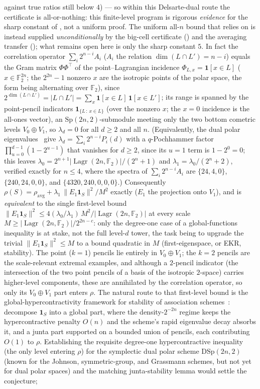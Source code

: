 \documentclass[11pt,a4paper]{article}
\theoremstyle{plain}
\theoremstyle{definition}
\newcommand{\F}{\mathbb{F}}
\DeclareMathOperator{\Lagr}{Lagr}
\begin{document}
against true ratios still below $4$) --- so within this Delsarte-dual route the certificate is all-or-nothing: this finite-level program is rigorous \emph{evidence} for the sharp constant of , not a uniform proof. The uniform all-$n$ bound that  relies on is instead supplied \emph{unconditionally} by the big-cell certificate () and the averaging transfer (); what remains open here is only the sharp constant $5$. In fact the correlation operator $\sum_i 2^{n-i} A_i$ ($A_i$ the relation $\dim(L\cap L')=n-i$) equals the Gram matrix $\Phi\Phi^{\top}$ of the point--Lagrangian incidence $\Phi_{L,x}=\mathbf 1[x\in L]$ ($x\in\F_2^{2n}$; the $2^{2n}-1$ nonzero $x$ are the isotropic points of the polar space, the form being alternating over $\F_2$), since $2^{\dim(L\cap L')}=|L\cap L'|=\sum_x \mathbf 1[x\in L]\,\mathbf 1[x\in L']$; its range is spanned by the point-pencil indicators $\mathbf 1_{\{L\,:\,x\in L\}}$ (over the nonzero $x$; the $x=0$ incidence is the all-ones vector), an $\mathrm{Sp}(2n,2)$-submodule meeting only the two bottom cometric levels $V_0\oplus V_1$, so $\lambda_d=0$ for all $d\ge 2$ and all $n$. (Equivalently, the dual polar eigenvalues~\cite{BCN89} give $\lambda_d=\sum_i 2^{n-i}P_i(d)$ with a $q$-Pochhammer factor $\prod_{u=0}^{d-1}(1-2^{u-1})$ that vanishes for $d\ge 2$, since its $u=1$ term is $1-2^0=0$; this leaves $\lambda_0=2^{n+1}|\Lagr(2n,\F_2)|/(2^n+1)$ and $\lambda_1=\lambda_0/(2^n+2)$, verified exactly for $n\le 4$, where the spectra of $\sum_i 2^{n-i}A_i$ are $\{24,4,0\}$, $\{240,24,0,0\}$, and $\{4320,240,0,0,0\}$.) Consequently $\rho(S)=\rho_{\mathrm{avg}}+\lambda_1\,\lVert E_1\mathbf 1_S\rVert^2/M^2$ exactly ($E_1$ the projection onto $V_1$), and  is \emph{equivalent} to the single first-level bound $\lVert E_1\mathbf 1_S\rVert^2 \le 4(\lambda_0/\lambda_1)\,M^2/|\Lagr(2n,\F_2)|$ at every scale $M\ge|\Lagr(2n,\F_2)|/2^{2n-c}$: only the degree-one case of a global-functions inequality is at stake, not the full level-$d$ tower, the task being to upgrade the trivial $\lVert E_1\mathbf 1_S\rVert^2\le M$ to a bound quadratic in $M$ (first-eigenspace, or EKR, stability). The point ($k{=}1$) pencils lie entirely in $V_0\oplus V_1$; the $k{=}2$ pencils are the scale-relevant extremal examples, and although a $2$-pencil indicator (the intersection of the two point pencils of a basis of the isotropic $2$-space) carries higher-level components, these are annihilated by the correlation operator, so only its $V_0\oplus V_1$ part enters $\rho$. The natural route to that first-level bound is the global-hypercontractivity framework for stability of association schemes~\cite{KLLM2024}: decompose $\mathbf 1_S$ into a global part, where the density-$2^{-2n}$ regime keeps the hypercontractive penalty $O(n)$ and the scheme's rapid eigenvalue decay absorbs it, and a junta part supported on a bounded union of pencils, each contributing $O(1)$ to $\rho$. Establishing the requisite degree-one hypercontractive inequality (the only level entering $\rho$) for the symplectic dual polar scheme $\mathrm{DSp}(2n,2)$ (known for the Johnson, symmetric-group, and Grassmann schemes, but not yet for dual polar spaces) and the matching junta-stability lemma would settle the conjecture; 
\end{document}
